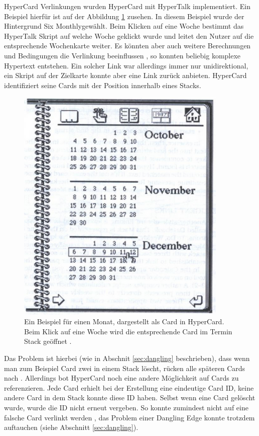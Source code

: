 \begin{section}{HyperCard}
Verlinkungen wurden HyperCard mit HyperTalk implementiert. Ein Beispiel hierfür ist auf der Abbildung \ref{fig:hypercardLink} zusehen. In diesem Beispiel wurde der Hintergrund \glqq Six Monthly\grqq{ }gewählt. Beim Klicken auf eine Woche bestimmt das HyperTalk Skript auf welche Woche geklickt wurde und leitet den Nutzer auf die entsprechende Wochenkarte weiter. Es könnten aber auch weitere Berechnungen und Bedingungen die Verlinkung beeinflussen \cite{Goodman1988}, so konnten beliebig komplexe Hypertext entstehen. Ein solcher Link war allerdings immer nur unidirektional, ein Skript auf der Zielkarte konnte aber eine Link zurück anbieten. HyperCard identifiziert seine Cards mit der Position innerhalb eines Stacks.

\begin{figure}[H]
	\centering
	\includegraphics[width=0.9\textwidth]{image/hypercardLink}
	\caption{Ein Beispiel für einen Monat, dargestellt als Card in HyperCard. Beim Klick auf eine Woche wird die entsprechende Card im Termin Stack geöffnet \cite{Goodman1988}.}
	\label{fig:hypercardLink}
\end{figure}

Das Problem ist hierbei (wie in Abschnit \ref{sec:dangling} beschrieben), dass wenn man zum Beispiel Card zwei in einem Stack löscht, rücken alle späteren Cards nach \cite{Goodman1988}. Allerdings bot HyperCard noch eine andere Möglichkeit auf Cards zu referenzieren. Jede Card erhielt bei der Erstellung eine eindeutige Card ID, keine andere Card in dem Stack konnte diese ID haben. Selbst wenn eine Card gelöscht wurde, wurde die ID nicht erneut vergeben. So konnte zumindest nicht auf eine falsche Card verlinkt werden \cite{Goodman1988}, das Problem einer Dangling Edge konnte trotzdem auftauchen (siehe Abschnitt \ref{sec:dangling}).

\end{section}

